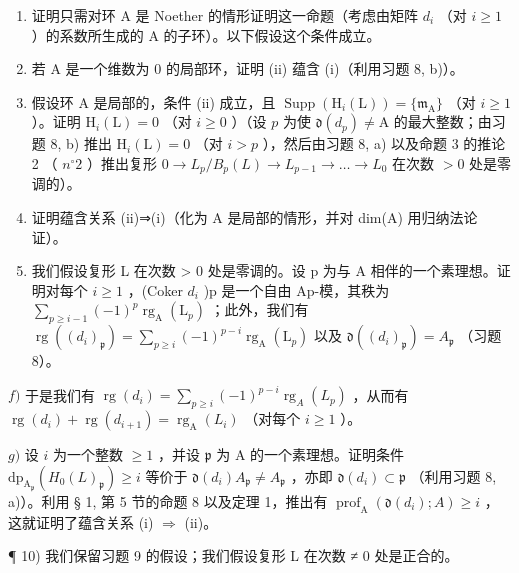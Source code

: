 \begin{enumerate}
\def\labelenumi{\alph{enumi})}
\item
  证明只需对环 A 是 Noether 的情形证明这一命题（考虑由矩阵 \(d_{i}\) （对 \(i \geqslant 1\) ）的系数所生成的 A 的子环）。以下假设这个条件成立。
\item
  若 A 是一个维数为 0 的局部环，证明 (ii) 蕴含 (i)（利用习题 8, b)）。
\item
  假设环 A 是局部的，条件 (ii) 成立，且 \(\operatorname{Supp}(\mathrm{H}_i(\mathrm{L})) = \{\mathfrak{m}_{\mathrm{A}}\}\) （对 \(i \geqslant 1\) ）。证明 \(\mathrm{H}_i(\mathrm{L}) = 0\) （对 \(i \geqslant 0\) ）（设 \(p\) 为使 \(\mathfrak{d}(d_p) \neq \mathrm{A}\) 的最大整数；由习题 8, b) 推出 \(\mathrm{H}_i(\mathrm{L}) = 0\) （对 \(i > p\) ），然后由习题 8, a) 以及命题 3 的推论 2 （ \(n^{\circ} 2\) ）推出复形 \(0 \to L_p / B_p(L) \to L_{p-1} \to \ldots \to L_0\) 在次数 \(>0\) 处是零调的）。
\item
  证明蕴含关系 (ii)⇒(i)（化为 A 是局部的情形，并对 dim(A) 用归纳法论证）。
\item
  我们假设复形 L 在次数 \textgreater{} 0 处是零调的。设 p 为与 A 相伴的一个素理想。证明对每个 \(i \geqslant 1\) ，(Coker \(d_{i}\) )p 是一个自由 Ap-模，其秩为 \(\sum_{p \geqslant i-1} (-1)^{p} \operatorname{rg}_{\mathrm{A}}(\mathrm{L}_{p})\) ；此外，我们有 \(\operatorname{rg}((d_{i})_{\mathfrak{p}}) = \sum_{p \geqslant i} (-1)^{p-i} \operatorname{rg}_{\mathrm{A}}(\mathrm{L}_{p})\) 以及 \(\mathfrak{d}((d_{i})_{\mathfrak{p}}) = A_{\mathfrak{p}}\) （习题 8）。
\end{enumerate}

\(f)\) 于是我们有 \(\operatorname{rg}(d_i) = \sum_{p \geqslant i} (-1)^{p - i} \operatorname{rg}_A(L_p)\) ，从而有 \(\operatorname{rg}(d_i) + \operatorname{rg}(d_{i+1}) = \operatorname{rg}_\mathrm{A}(L_i)\) （对每个 \(i \geqslant 1\) ）。

\(g)\) 设 \(i\) 为一个整数 \(\geqslant 1\) ，并设 \(\mathfrak{p}\) 为 \(\mathrm{A}\) 的一个素理想。证明条件 \(\mathrm{dp}_{\mathrm{A}_{\mathfrak{p}}}(H_0(L)_{\mathfrak{p}}) \geqslant i\) 等价于 \(\mathfrak{d}(d_i)A_{\mathfrak{p}} \neq A_{\mathfrak{p}}\) ，亦即 \(\mathfrak{d}(d_i) \subset \mathfrak{p}\) （利用习题 8, a)）。利用 § 1, 第 5 节的命题 8 以及定理 1，推出有 \(\operatorname{prof}_{\mathrm{A}}(\mathfrak{d}(d_i); A) \geqslant i\) ，这就证明了蕴含关系 (i) \(\Rightarrow\) (ii)。

¶ 10) 我们保留习题 9 的假设；我们假设复形 L 在次数 ≠ 0 处是正合的。

